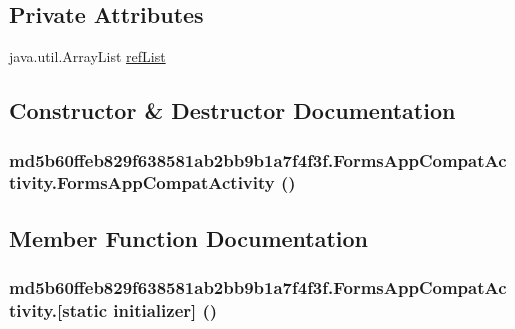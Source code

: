 \subsection*{Private Attributes}
\begin{CompactItemize}
\item 
java.util.ArrayList \hyperlink{classmd5b60ffeb829f638581ab2bb9b1a7f4f3f_1_1_forms_app_compat_activity_3c2387fd0251d4204c05843857d67c60}{refList}
\end{CompactItemize}


\subsection{Constructor \& Destructor Documentation}
\hypertarget{classmd5b60ffeb829f638581ab2bb9b1a7f4f3f_1_1_forms_app_compat_activity_2d1a359f1aef2685ff63e85c9fe9bb9a}{
\subsubsection[{FormsAppCompatActivity}]{\setlength{\rightskip}{0pt plus 5cm}md5b60ffeb829f638581ab2bb9b1a7f4f3f.FormsAppCompatActivity.FormsAppCompatActivity ()}}
\label{classmd5b60ffeb829f638581ab2bb9b1a7f4f3f_1_1_forms_app_compat_activity_2d1a359f1aef2685ff63e85c9fe9bb9a}




\subsection{Member Function Documentation}
\hypertarget{classmd5b60ffeb829f638581ab2bb9b1a7f4f3f_1_1_forms_app_compat_activity_6a161f889b5107b95ec5f85d90689265}{
\subsubsection[{[static initializer]}]{\setlength{\rightskip}{0pt plus 5cm}md5b60ffeb829f638581ab2bb9b1a7f4f3f.FormsAppCompatActivity.\mbox{[}static initializer\mbox{]} ()}}
\label{classmd5b60ffeb829f638581ab2bb9b1a7f4f3f_1_1_forms_app_compat_activity_6a161f889b5107b95ec5f85d90689265}




